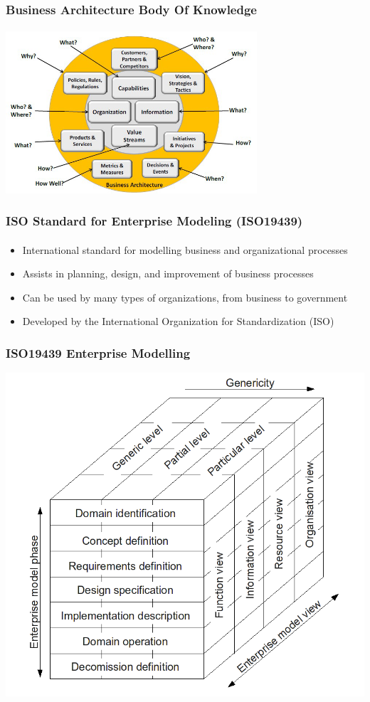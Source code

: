\documentclass[aspectratio=169, table]{beamer}
\begin{document}
    {
        \begin{frame}
            \frametitle{Business Architecture Body Of Knowledge}
            \framesubtitle{\hspace{1cm}}
            \begin{center}
                \includegraphics[width=0.7\textwidth]{../figures/bizbok}
            \end{center}
        \end{frame}
    }

    \begin{frame}
        \frametitle{ISO Standard for Enterprise Modeling (ISO19439)}
        \framesubtitle{\hspace{1cm}}
        \begin{itemize}
            \item International standard for modelling business and organizational processes
            \item Assists in planning, design, and improvement of business processes
            \item Can be used by many types of organizations, from business to government
            \item Developed by the International Organization for Standardization (ISO)
        \end{itemize}
    \end{frame}

    {
        \begin{frame}
            \frametitle{ISO19439 Enterprise Modelling}
            \begin{center}
                \includegraphics[width=.45\textwidth]{../figures/iso19439}
            \end{center}
        \end{frame}
    }
\end{document}
